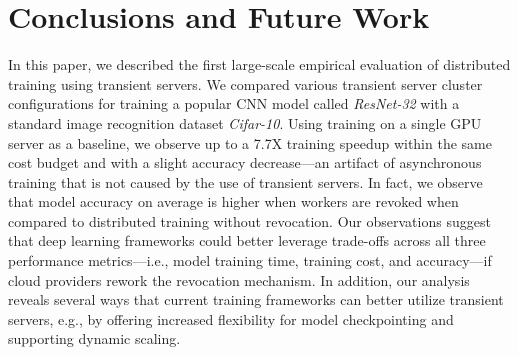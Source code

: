 \section{Conclusions and Future Work}

In this paper, we described the first large-scale empirical evaluation of
distributed training using transient servers.  We compared various transient
server cluster configurations for training a popular CNN model called
\emph{ResNet-32} with a standard image recognition dataset \emph{Cifar-10}.
Using  training on a single GPU server as a baseline,  we observe up to a 7.7X
training speedup within the same cost budget and with a slight accuracy
decrease---an artifact of asynchronous training that is not caused by the use
of transient servers. In fact, we observe that model accuracy on average is
higher when workers are revoked when compared to distributed training without
revocation. Our observations suggest that deep learning frameworks could better
leverage trade-offs across all three performance metrics---i.e., model training
time, training cost, and accuracy---if cloud providers rework the revocation
mechanism. In addition, our analysis reveals several ways that current training
frameworks can better utilize transient servers, e.g., by offering increased
flexibility for model checkpointing and supporting dynamic scaling.  


%
